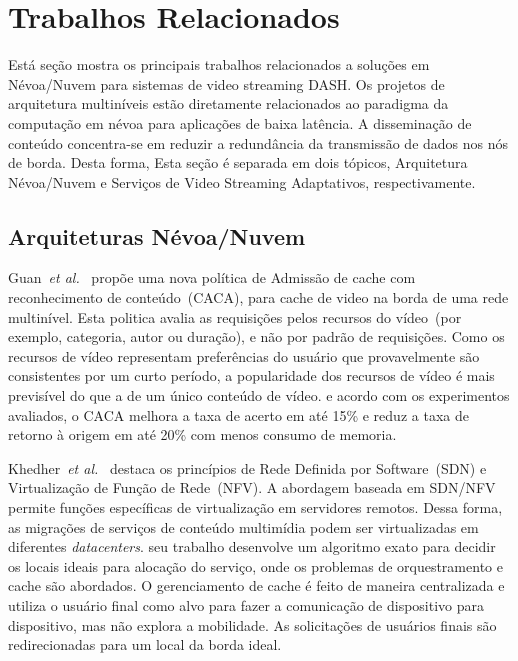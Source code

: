 \section{Trabalhos Relacionados}
\label{ch:related-work}

Está seção mostra os principais trabalhos relacionados a soluções em Névoa/Nuvem para sistemas de video streaming DASH. 
Os projetos de arquitetura multiníveis estão diretamente relacionados ao paradigma da computação em névoa para aplicações de baixa latência. A disseminação de conteúdo concentra-se em reduzir a redundância da transmissão de dados nos nós de borda. Desta forma, Esta seção é separada em dois tópicos, Arquitetura Névoa/Nuvem e Serviços de Video Streaming Adaptativos, respectivamente. 

\subsection{Arquiteturas Névoa/Nuvem}
\label{subsec:arch-cloud-fog}


Guan~\textit{et al.}~\cite{guan:2019:CLC} propõe uma nova política de Admissão de cache com reconhecimento de conteúdo~(CACA), para cache de video na borda de uma rede multinível. Esta politica avalia as requisições pelos recursos do vídeo~(por exemplo, categoria, autor ou duração), e não por padrão de requisições. Como os recursos de vídeo representam preferências do usuário que provavelmente são consistentes por um curto período, a popularidade dos recursos de vídeo é mais previsível do que a de um único conteúdo de vídeo. e acordo com os experimentos avaliados, o CACA melhora a taxa de acerto em até 15\% e reduz a taxa de retorno à origem em até 20\% com menos consumo de memoria.

Khedher~\textit{et al.}~\cite{khedherComNet2017, khedherLCN2017} destaca os princípios de Rede Definida por Software~(SDN) e Virtualização de Função de Rede~(NFV). A abordagem baseada em SDN/NFV permite funções específicas de virtualização em servidores remotos. Dessa forma, as migrações de serviços de conteúdo multimídia podem ser virtualizadas em diferentes \textit{datacenters}. seu trabalho desenvolve um algoritmo exato para decidir os locais ideais para alocação do serviço, onde os problemas de orquestramento e cache são abordados. 
O gerenciamento de cache é feito de maneira centralizada e utiliza o usuário final como alvo para fazer a comunicação de dispositivo para dispositivo, mas não explora a mobilidade. As solicitações de usuários finais são redirecionadas para um local da borda ideal.%

